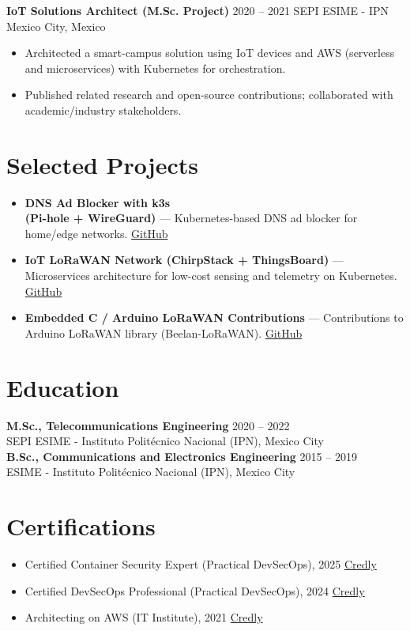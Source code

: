 \documentclass[11pt,a4paper]{article}
\newcommand{\role}[2]{\textbf{#1} \hfill {\small #2}}%
\newcommand{\org}[2]{{#1} \hfill {\small #2}}%
\begin{document}
\role{IoT Solutions Architect (M.Sc. Project)}{2020 -- 2021}
\org{SEPI ESIME - IPN}{Mexico City, Mexico}
\begin{itemize}
  \item Architected a smart-campus solution using IoT devices and AWS (serverless and microservices) with Kubernetes for orchestration.
  \item Published related research and open-source contributions; collaborated with academic/industry stakeholders.
\end{itemize}

\section*{Selected Projects}
\begin{itemize}
  \item \textbf{DNS Ad Blocker with k3s \\ (Pi-hole + WireGuard)} — Kubernetes-based DNS ad blocker for home/edge networks. \href{https://github.com/ivanmorenoj/k3s-pihole-wireguard}{GitHub}
  \item \textbf{IoT LoRaWAN Network (ChirpStack + ThingsBoard)} — Microservices architecture for low-cost sensing and telemetry on Kubernetes. \href{https://github.com/ivanmorenoj/chirpstack-thingsboard}{GitHub}
  \item \textbf{Embedded C / Arduino LoRaWAN Contributions} — Contributions to Arduino LoRaWAN library (Beelan-LoRaWAN). \href{https://github.com/BeelanMX/Beelan-LoRaWAN}{GitHub}
\end{itemize}

\section*{Education}
\textbf{M.Sc., Telecommunications Engineering} \hfill 2020 -- 2022\\
SEPI ESIME - Instituto Politécnico Nacional (IPN), Mexico City\\[4pt]
\textbf{B.Sc., Communications and Electronics Engineering} \hfill 2015 -- 2019\\
ESIME - Instituto Politécnico Nacional (IPN), Mexico City

\section*{Certifications}
\begin{itemize}
  \item Certified Container Security Expert (Practical DevSecOps), 2025 \hfill \href{https://www.credly.com/badges/f84b8130-c4e0-4e3f-b8ff-2dc04cc5b40b/public_url}{Credly}
  \item Certified DevSecOps Professional (Practical DevSecOps), 2024 \hfill \href{https://www.credly.com/badges/b6ffc094-a1c5-4e28-b08e-192769fa2206/public_url}{Credly}
  \item Architecting on AWS (IT Institute), 2021 \hfill \href{https://www.credly.com/badges/cafb146b-ed0d-4de2-bd07-8628481f3347/public_url}{Credly}
\end{itemize}
\end{document}
